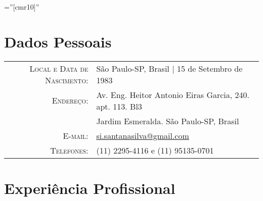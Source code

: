 \documentclass[a4paper,10pt]{article} %
\begin{document}
\pagestyle{empty} %

\font\fb=''[cmr10]'' %


\par{\bigskip\par} %

\section{Dados Pessoais}

\begin{tabular}{rl}
  \textsc{Local e Data de Nascimento:} & S\~ao Paulo-SP, Brasil | 15 de Setembro de 1983 \\
\textsc{Endereço:} & Av. Eng. Heitor Antonio Eiras Garcia, 240. apt. 113. Bl3\\& Jardim Esmeralda. São Paulo-SP, Brasil \\
\textsc{E-mail:} & \href{mailto:si.santanasilva@gmail.com}{si.santanasilva@gmail.com}\\
\textsc{Telefones:} & (11) 2295-4116 e (11) 95135-0701\\

\end{tabular}




\section{Experiência Profissional}
\end{document}
